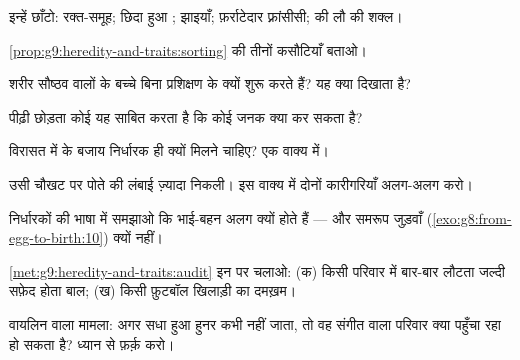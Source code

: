 \begin{exercise}[$\star$]\label{exo:g9:heredity-and-traits:2}
इन्हें छाँटो: रक्त-समूह; छिदा हुआ ; झाइयाँ; फ़र्राटेदार फ़्रांसीसी;
 की लौ की शक्ल।
\end{exercise}

\begin{exercise}[$\star$]\label{exo:g9:heredity-and-traits:3}
\cref{prop:g9:heredity-and-traits:sorting} की तीनों कसौटियाँ बताओ।
\end{exercise}

\begin{exercise}[$\star$]\label{exo:g9:heredity-and-traits:4}
शरीर सौष्ठव वालों के बच्चे बिना प्रशिक्षण के क्यों शुरू करते हैं? यह
क्या दिखाता है?
\end{exercise}

\begin{exercise}[$\star$]\label{exo:g9:heredity-and-traits:5}
पीढ़ी छोड़ता कोई  यह साबित करता है कि कोई जनक क्या कर सकता है?
\end{exercise}

\begin{exercise}[$\star$]\label{exo:g9:heredity-and-traits:6}
विरासत में  के बजाय निर्धारक ही क्यों मिलने चाहिए? एक वाक्य में।
\end{exercise}

\begin{exercise}[$\star\star$]\label{exo:g9:heredity-and-traits:7}
उसी चौखट पर पोते की लंबाई ज़्यादा निकली। इस वाक्य में दोनों कारीगरियाँ
अलग-अलग करो।
\end{exercise}

\begin{exercise}[$\star\star$]\label{exo:g9:heredity-and-traits:8}
निर्धारकों की भाषा में समझाओ कि भाई-बहन अलग क्यों होते हैं --- और
समरूप जुड़वाँ (\cref{exo:g8:from-egg-to-birth:10}) क्यों नहीं।
\end{exercise}

\begin{exercise}[$\star\star$]\label{exo:g9:heredity-and-traits:9}
\cref{met:g9:heredity-and-traits:audit} इन पर चलाओ: (क) किसी परिवार में
बार-बार लौटता जल्दी सफ़ेद होता बाल; (ख) किसी फ़ुटबॉल खिलाड़ी का दमख़म।
\end{exercise}

\begin{exercise}[$\star\star$]\label{exo:g9:heredity-and-traits:10}
वायलिन वाला मामला: अगर सधा हुआ हुनर कभी नहीं जाता, तो वह संगीत वाला
परिवार क्या पहुँचा रहा हो सकता है? ध्यान से फ़र्क़ करो।
\end{exercise}

